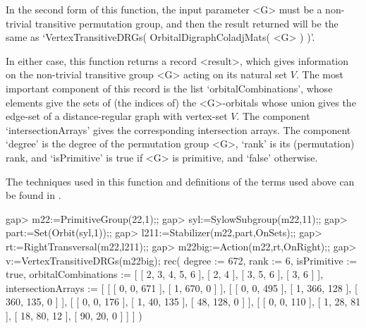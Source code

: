In the second form of this function, the input parameter <G> must be a
non-trivial transitive permutation group, and then the result returned
will be the same as `VertexTransitiveDRGs( OrbitalDigraphColadjMats( <G>
) )'.

In either case, this function returns a record <result>, which gives
information on the non-trivial transitive group <G> acting on its
natural set $V$.  The most important component of this record is the list
`orbitalCombinations', whose elements give the sets of (the indices of)
the <G>-orbitals whose union gives the edge-set of a distance-regular
graph with vertex-set $V$. The component `intersectionArrays' gives
the corresponding intersection arrays. The component `degree' is the
degree of the permutation group <G>, `rank' is its (permutation) rank,
and `isPrimitive' is true if <G> is primitive, and `false' otherwise.

The techniques used in this function and definitions of the terms used
above can be found in \cite{PS97}.

\beginexample
gap> m22:=PrimitiveGroup(22,1);;
gap> syl:=SylowSubgroup(m22,11);;
gap> part:=Set(Orbit(syl,1));;
gap> l211:=Stabilizer(m22,part,OnSets);;
gap> rt:=RightTransversal(m22,l211);;
gap> m22big:=Action(m22,rt,OnRight);;
gap> v:=VertexTransitiveDRGs(m22big);
rec( degree := 672, rank := 6, isPrimitive := true, 
  orbitalCombinations := [ [ 2, 3, 4, 5, 6 ], [ 2, 4 ], [ 3, 5, 6 ], [ 3, 6 ] 
     ], 
  intersectionArrays := [ [ [ 0, 0, 671 ], [ 1, 670, 0 ] ], [ [ 0, 0, 495 ], 
          [ 1, 366, 128 ], [ 360, 135, 0 ] ], 
      [ [ 0, 0, 176 ], [ 1, 40, 135 ], [ 48, 128, 0 ] ], 
      [ [ 0, 0, 110 ], [ 1, 28, 81 ], [ 18, 80, 12 ], [ 90, 20, 0 ] ] ] )
\endexample
